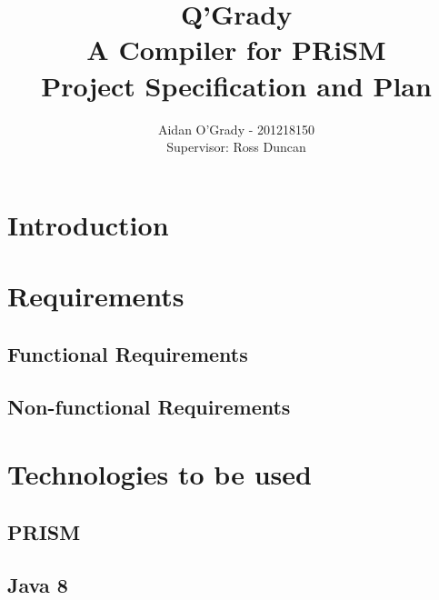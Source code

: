 \documentclass[11pt, a4paper]{article}
\begin{document}
\title{Q'Grady \\A Compiler for PRiSM \\
\large{Project Specification and Plan}}
\author{Aidan O'Grady - 201218150\\Supervisor: Ross Duncan}
\date{}
\maketitle

\section{Introduction} %
\label{sec:introduction}

\section{Requirements} %
\label{sec:requirements}

\subsection{Functional Requirements} %
\label{sub:functional_requirements}

\subsection{Non-functional Requirements} %
\label{sub:non_functional_requirements}

\newpage
\section{Technologies to be used} %
\label{sec:technologies_to_be_used}

\subsection{PRISM}
\label{sub:prism}

\subsection{Java 8}
\label{sub:java_eight}
\end{document}
